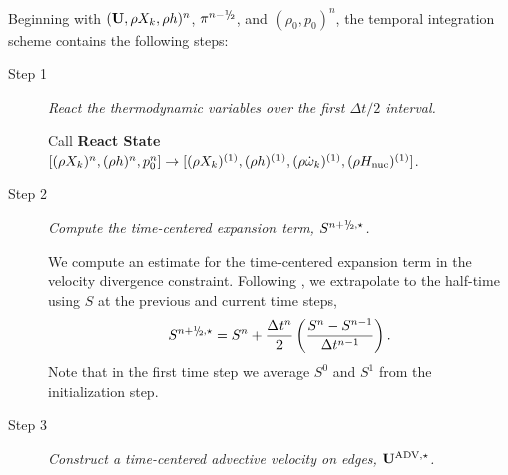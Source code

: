 Beginning with $({\bf{U}},\rho X_k,\rho h)^n$, $\pi^{n-\myhalf}$, and $(\rho_0,p_0)^n$,
the temporal integration scheme contains the following steps:
\begin{description}

\item[Step 1] {\em React the thermodynamic variables over the first $\Delta t / 2$ interval.}

Call {\bf React State}$[(\rho X_k)^n, (\rho h)^n, p_0^n] \rightarrow [(\rho X_k)^{(1)}, (\rho h)^{(1)}, (\rho \dot\omega_k)^{(1)}, (\rho H_{\rm nuc})^{(1)}]$.


\item[Step 2] {\em Compute the time-centered expansion term, $S^{\nph,\star}$.}

We compute an estimate for the time-centered expansion term in the velocity
divergence constraint.  Following \citet{Bell:2004}, we extrapolate
to the half-time using $S$ at the previous and current
time steps,
\begin{equation}
S^{\nph,\star} = S^n + \frac{\dt^n}{2} \left(\frac{S^n - S^{n-1}}{\dt^{n-1}}\right).
\end{equation}
Note that in the first time step we average $S^0$ and $S^1$ from the
initialization step.

\item[Step 3] {\em Construct a time-centered advective velocity on edges, ${\bf{U}}^{\mathrm{ADV},\star}$.}


\end{description}
